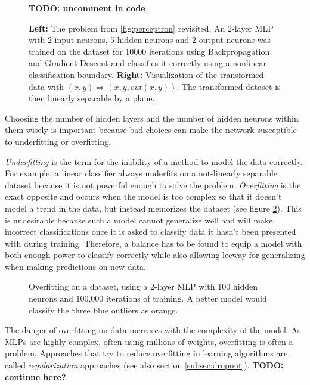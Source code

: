 \begin {figure}[!ht]
		\begin{center}
			\textbf{TODO: uncomment in code}
		\end{center}
		\caption[]{\textbf{Left:} The problem from \ref{fig:perceptron} revisited. An 2-layer MLP with 2 input neurons, 5 hidden neurons and 2 output neurons was trained on the dataset for 10000 iterations using Backpropagation and Gradient Descent and classifies it correctly using a nonlinear classification boundary. \textbf{Right:} Visualization of the transformed data with $(x, y) \Rightarrow (x, y, out(x, y))$. The transformed dataset is then linearly separable by a plane.}
		\label{fig:mlp_trick}
	\end {figure}

\noindent Choosing the number of hidden layers and the number of hidden neurons within them wisely is important because bad choices can make the network susceptible to underfitting or overfitting.

\textit{Underfitting} is the term for the inability of a method to model the data correctly. For example, a linear classifier always underfits on a not-linearly separable dataset because it is not powerful enough to solve the problem. \textit{Overfitting} is the exact opposite and occurs when the model is too complex so that it doesn't model a trend in the data, but instead memorizes the dataset (see figure \ref{fig:overfit}). This is undesirable because such a model cannot generalize well and will make incorrect classifications once it is asked to classify data it hasn't been presented with during training. Therefore, a balance has to be found to equip a model with both enough power to classify correctly while also allowing leeway for generalizing when making predictions on new data.

	\begin {figure}[!ht]
		\begin{center}
			\scalebox{0.75}{}
		\end{center}
		\caption[]{Overfitting on a dataset, using a 2-layer MLP with 100 hidden neurons and 100,000 iterations of training. A better model would classify the three blue outliers as orange.}
		\label{fig:overfit}
	\end {figure}

\noindent The danger of overfitting on data increases with the complexity of the model. As MLPs are highly complex, often using millions of weights, overfitting is often a problem. Approaches that try to reduce overfitting in learning algorithms are called \textit{regularization} approaches (see also section \ref{subsec:dropout}). \textbf{TODO: continue here?}
